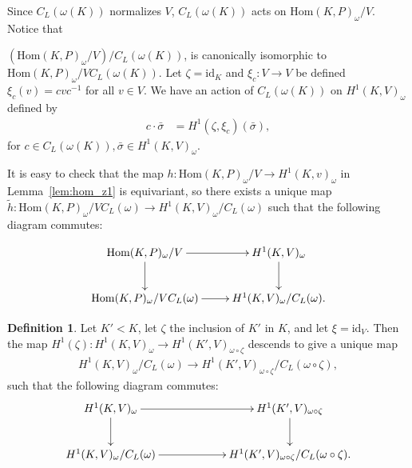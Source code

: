 \documentclass[12pt]{amsart}
\numberwithin{equation}{section}
\theoremstyle{definition}
\newtheorem{defn}[equation]{Definition}
\theoremstyle{remark}
\theoremstyle{remark}
\begin{document}
Since $C_L\left(\omega(K)\right)$ normalizes $V$, $C_L\left(\omega(K)\right)$ acts on $\mathrm{Hom}(K, P)_\omega/V$.
Notice that

$\left(\mathrm{Hom}(K, P)_\omega/V\right)/C_L\left(\omega(K)\right)$,
is canonically isomorphic to
$\mathrm{Hom}(K, P)_\omega/VC_L\left(\omega(K)\right)$.
Let $\zeta=\mathrm{id}_K$ and $\xi_c:V\rightarrow V$ be defined $\xi_c(v) = cvc^{-1}$ for all $v\in V$. We have an action of $C_L(\omega(K))$ on $H^1(K, V)_\omega$ defined by
\begin{align*} \label{cl.h1}
	c \cdot \bar{\sigma}
	&= H^1(\zeta, \xi_c)\left(\bar{\sigma}\right), 
\end{align*}
for $c \in C_L(\omega(K)), \bar{\sigma} \in H^1(K, V)_\omega$.

It is easy to check that the map 
$h:\mathrm{Hom}(K, P)_\omega/V\rightarrow H^1(K, v)_\omega$
in Lemma~\ref{lem:hom_z1} is equivariant, so there exists a unique map $\tilde{h}:\mathrm{Hom}(K, P)_{\omega}/VC_L(\omega) \rightarrow H^{1}(K, V)_\omega/C_L(\omega)$ such that the following diagram commutes:

\begin{align*}
\xymatrix{
\mathrm{Hom}(K, P)_{\omega}/V \ar[r]     \ar[d] & H^{1}(K, V)_\omega \ar[d] \\
\mathrm{Hom}(K, P)_{\omega}/VC_L(\omega) \ar[r] & H^{1}(K, V)_\omega/C_L(\omega).
}
\end{align*}

\begin{defn} Let $K' < K$, let $\zeta$ the inclusion of $K'$ in $K$, and let $\xi=\mathrm{id}_V$. Then the map $H^1(\zeta):H^1(K, V)_\omega \rightarrow H^1(K', V)_{\omega\circ\zeta}$ descends to give a unique map
\begin{align*}
	H^1(K, V)_\omega/C_L(\omega) \rightarrow H^1(K', V)_{\omega\circ\zeta}/C_L(\omega\circ \zeta),
\end{align*}
such that the following diagram commutes:
\begin{align*}
    \xymatrix@C=60pt{
		H^1(K, V)_\omega \ar[r] \ar[d]      & H^1(K', V)_{\omega\circ\zeta} \ar[d] \\
		H^1(K, V)_\omega/C_L(\omega) \ar[r] & {H^1(K', V)_{\omega\circ\zeta}/C_L(\omega\circ\zeta)}.
    }
  \end{align*}
\end{defn}
\end{document}
